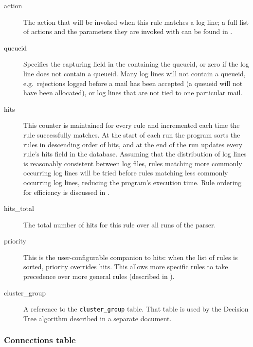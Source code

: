 \begin{description}
    \item [action] The action that will be invoked when this rule matches a
        log line; a full list of actions and the parameters they are
        invoked with can be found in .

    \item [queueid] Specifies the capturing field in the \regex{}
        containing the queueid, or zero if the log line does not contain a
        queueid.  Many log lines will not contain a queueid, e.g.\
        rejections logged before a mail has been accepted (a queueid will
        not have been allocated), or log lines that are not tied to one
        particular mail.

    \item [hits] This counter is maintained for every rule and incremented
        each time the rule successfully matches.  At the start of each run
        the program sorts the rules in descending order of hits, and at the
        end of the run updates every rule's hits field in the database.
        Assuming that the distribution of log lines is reasonably
        consistent between log files, rules matching more commonly
        occurring log lines will be tried before rules matching less
        commonly occurring log lines, reducing the program's execution
        time.  Rule ordering for efficiency is discussed in
        .

    \item [hits\_total] The total number of hits for this rule over all
        runs of the parser.

    \item [priority] This is the user-configurable companion to hits: when
        the list of rules is sorted, priority overrides hits.  This allows
        more specific rules to take precedence over more general rules
        (described in \sectionref{overlapping rules}).

    \item [cluster\_group] A reference to the \texttt{cluster\_group}
        table.  That table is used by the Decision Tree algorithm described
        in a separate document.

\end{description}


\subsubsection{Connections table}

